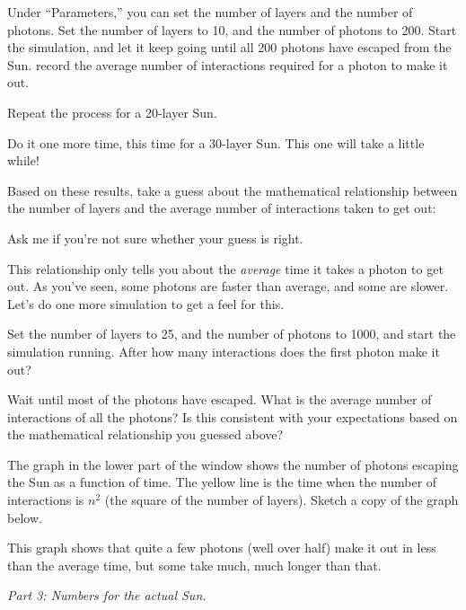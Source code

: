 Under ``Parameters,'' you can set the number of layers and the number of
photons. Set the number of layers to 10, and the number of photons to 200.
Start the simulation, and let it keep going until all 200 photons have escaped
from the Sun.
record
the average number of interactions required for a photon to make it out.

\vskip 1in


Repeat the process for a 20-layer Sun.  


\vskip 1in



Do it one more time, this time for a 30-layer Sun. This one will take
a little while!

\vskip 1in

Based on these results, take a guess about the mathematical relationship
between the number of layers and the average number of interactions
taken to get out:

\vskip 1in

Ask me if you're not sure whether your guess is right.

This relationship only tells you about the {\it average} time it takes
a photon to get out.  As you've seen,
some photons are faster than average, and some
are slower. Let's do one more simulation to get a feel for this.

Set the number of layers to 25, and the number of photons to 1000,
and start the simulation running.  After how many interactions
does the first photon make it out?

\vskip 1in

Wait until most of the photons have escaped.  What is the average number
of interactions of all the photons?  Is this consistent with your
expectations based on the mathematical relationship you guessed above?

\vskip 1in

The graph in the lower part of the window shows the number of photons
escaping the Sun as a function of time.  The yellow line is the time
when the number of interactions is $n^2$ (the square of the
number of layers).  Sketch a copy of the graph below.

\vskip 2in

This graph shows that quite a few photons (well over half) make it out
in less than the average time, but some take much, much longer than that.

\medskip

{\it Part 3: Numbers for the actual Sun.}

